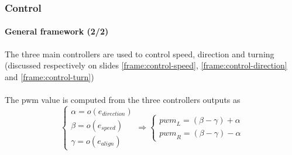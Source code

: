 \documentclass[10pt]{beamer}
\begin{document}

\begin{frame}
\frametitle{Control}
\framesubtitle{General framework (2/2)}
The three main controllers are used to control speed, direction and turning (discussed respectively on slides \ref{frame:control-speed}, \ref{frame:control-direction} and \ref{frame:control-turn}) \\~\\
The pwm value is computed from the three controllers outputs as
$$ 
\left\{
    \begin{array}{ll}
		\alpha = o(e_{direction}) \\[0.3cm]
		\beta = o(e_{speed}) \\[0.3cm]
		\gamma = o(e_{align})
	\end{array}
\right.
\Rightarrow
\left\{
    \begin{array}{ll}
		{pwm}_L =  (\beta -\gamma) + \alpha \\
		{pwm}_R = (\beta - \gamma) - \alpha
	\end{array}
\right.
$$
\end{frame}

\end{document}
